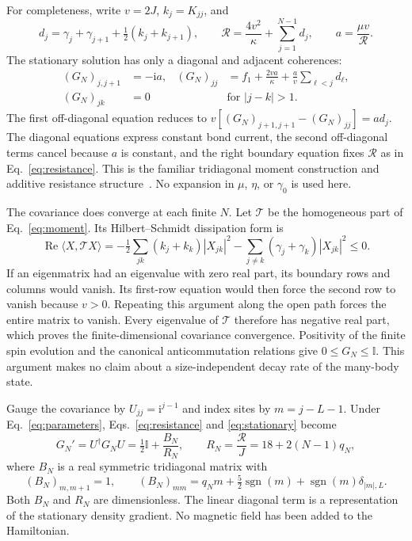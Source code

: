 \documentclass[11pt,a4paper]{article}
\newcommand{\sgn}{\operatorname{sgn}}
\newcommand{\ii}{\mathrm{i}}
\newcommand{\Id}{\mathbb{I}}
\begin{document}
For completeness, write $v=2J$, $k_j=K_{jj}$, and
\begin{equation}
 d_j=\gamma_j+\gamma_{j+1}+\tfrac12(k_j+k_{j+1}),\qquad
 \mathcal R=\frac{4v^2}{\kappa}+\sum_{j=1}^{N-1}d_j,
 \qquad a=\frac{\mu v}{\mathcal R}.
 \label{eq:resistance}
\end{equation}
The stationary solution has only a diagonal and adjacent coherences:
\begin{align}
 (G_N)_{j,j+1}&=-\ii a,&
 (G_N)_{jj}&=f_1+\frac{2va}{\kappa}
                  +\frac{a}{v}\sum_{\ell<j}d_\ell,
 \label{eq:stationary}\\
 (G_N)_{jk}&=0&&\text{for }|j-k|>1.
 \nonumber
\end{align}
The first off-diagonal equation reduces to
$v[(G_N)_{j+1,j+1}-(G_N)_{jj}]=a d_j$.
The diagonal equations express constant bond current, the second
off-diagonal terms cancel because $a$ is constant, and the right
boundary equation fixes $\mathcal R$ as in Eq.~\eqref{eq:resistance}.
This is the familiar tridiagonal moment construction and additive
resistance structure~\cite{Znidaric2010,Asadian2013}.
No expansion in $\mu$, $\eta$, or $\gamma_0$ is used here.

The covariance does converge at each finite $N$. Let $\mathcal T$ be
the homogeneous part of Eq.~\eqref{eq:moment}. Its Hilbert--Schmidt
dissipation form is
\begin{equation}
 \operatorname{Re}\langle X,\mathcal T X\rangle
 =-\tfrac12\sum_{jk}(k_j+k_k)|X_{jk}|^2
  -\sum_{j\ne k}(\gamma_j+\gamma_k)|X_{jk}|^2\le0.
 \label{eq:decay}
\end{equation}
If an eigenmatrix had an eigenvalue with zero real part, its boundary
rows and columns would vanish. Its first-row equation would then force
the second row to vanish because $v>0$. Repeating this argument along
the open path forces the entire matrix to vanish. Every eigenvalue of
$\mathcal T$ therefore has negative real part, which proves the
finite-dimensional covariance convergence. Positivity of the finite
spin evolution and the canonical anticommutation relations give
$0\le G_N\le\Id$. This argument makes no claim about a size-independent
decay rate of the many-body state.

Gauge the covariance by $U_{jj}=\ii^{j-1}$ and index sites by
$m=j-L-1$. Under Eq.~\eqref{eq:parameters}, Eqs.~\eqref{eq:resistance}
and \eqref{eq:stationary} become
\begin{equation}
 G_N'=U^\dagger G_NU=\tfrac12\Id+\frac{B_N}{R_N},
 \qquad R_N=\frac{\mathcal R}{J}=18+2(N-1)q_N,
 \label{eq:reduction}
\end{equation}
where $B_N$ is a real symmetric tridiagonal matrix with
\begin{equation}
 (B_N)_{m,m+1}=1,\qquad
 (B_N)_{mm}=q_Nm+\tfrac52\sgn(m)+\sgn(m)\delta_{|m|,L}.
 \label{eq:B}
\end{equation}
Both $B_N$ and $R_N$ are dimensionless. The linear diagonal term is a
representation of the stationary density gradient. No magnetic field
has been added to the Hamiltonian.
\end{document}
